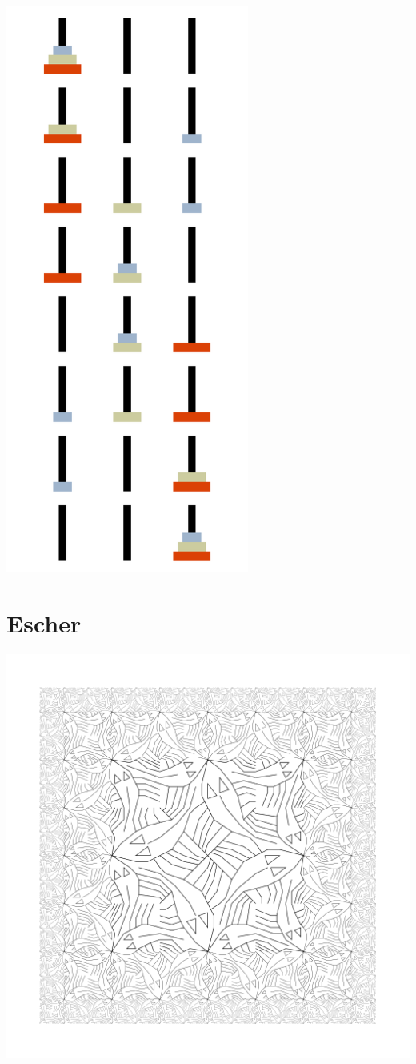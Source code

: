 \documentclass{article}%
\begin{document}
\includegraphics[width=0.6\textwidth]{examples/output/hanoi.pdf}
\pagebreak

\section{Escher}

\includegraphics[width=\textwidth]{examples/output/escher-square-limit.png}
\end{document}
